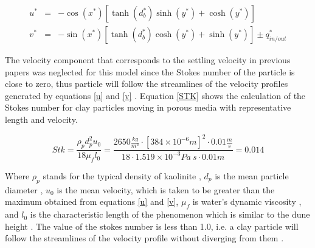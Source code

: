 \documentclass[draft,linenumbers]{agujournal2018}
\begin{document}
\begin{eqnarray}
\label{ustar}
  u^* & = & -\cos(x^*)[\tanh(d_b^*)\sinh(y^*) + \cosh(y^*)]\\
\label{vstar}
  v^* & = & -\sin(x^*)[\tanh(d_b^*)\cosh(y^*) + \sinh(y^*)] \pm q_{in/out}^*
\end{eqnarray}

The velocity component that corresponds to the settling velocity in previous papers \citep{Packman2000} was neglected for this model since the Stokes number of the particle is close to zero, thus particle will follow the streamlines of the velocity profiles generated by equations \ref{u} and \ref{v} \citep{Clark2009}. Equation \ref{STK} shows the calculation of the Stokes number for clay particles moving in porous media with representative length and velocity. 

\begin{equation}
 \label{STK}
 	Stk = \frac{\rho_p d_p^2 u_0}{18 \mu_f l_0} = \frac{2650 \frac{kg}{m^3} \cdot [384 \times 10^{-6}m]^2 \cdot 0.01 \frac{m}{s}}{18 \cdot 1.519 \times 10^{-3}Pa \ s \cdot 0.01 m} = 0.014
 \end{equation}

Where $\rho_p$ stands for the typical density of kaolinite \citep{NationalCenterforBiotechnologyInformation}, $d_p$ is the mean particle diameter \citep{Fox2014}, $u_0$ is the mean velocity, which is taken to be greater than the maximum obtained from equations \ref{u} and \ref{v}, $\mu_f$ is water's dynamic viscosity \citep{Cengel2006}, and $l_0$ is the characteristic length of the phenomenon which is similar to the dune height \citep{Fox2018}. The value of the stokes number is less than 1.0, i.e. a clay particle will follow the streamlines of the velocity profile without diverging from them \citep{Tropea2007}.
\end{document}
